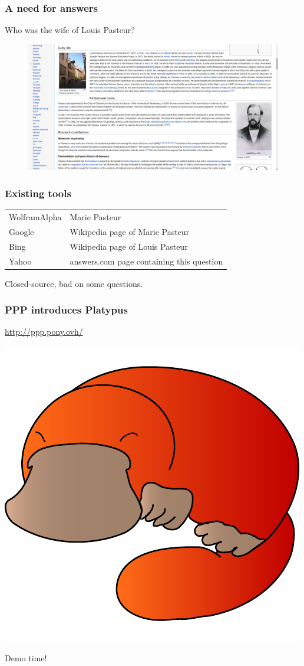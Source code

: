 \begin{frame}[fragile]
    \frametitle{A need for answers}
    \alert{Who was the wife of Louis Pasteur?}
    \begin{figure}
        \includegraphics[width=\textwidth]{pasteurWiki.png}
    \end{figure}
\end{frame}

\begin{frame}[fragile]
    \frametitle{Existing tools}
    \begin{tabular}{ll}
        WolframAlpha & Marie Pasteur\\
        Google & Wikipedia page of Marie Pasteur\\
        Bing & Wikipedia page of Louis Pasteur\\
        Yahoo & answers.com page containing this question
    \end{tabular}
\medbreak
\alert{Closed-source, bad on some questions.}
\end{frame}

\begin{frame}[fragile]
    \frametitle{PPP introduces Platypus}
    \begin{center}
        \url{http://ppp.pony.ovh/}
        
        \bigskip
        
        \includegraphics[width=0.6\linewidth]{figures/platypus.pdf}
    \end{center}
\end{frame}

\begin{frame}
    \begin{center}
        \Huge Demo time!
    \end{center}
\end{frame}
